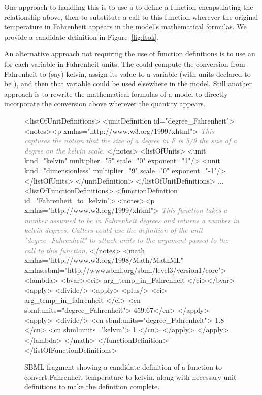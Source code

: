 \begin{itemize}
  One approach to handling this is to use a \FunctionDefinition to
  define a function encapsulating the relationship above, then to
  substitute a call to this function wherever the original
  temperature in Fahrenheit appears in the model's mathematical
  formulas.  We provide a candidate definition in
  Figure~\vref{fig:ftok}. 

  An alternative approach not requiring the use of function
  definitions is to use an \AssignmentRule for each variable in
  Fahrenheit units.  The \AssignmentRule could compute the
  conversion from Fahrenheit to (say) kelvin, assign its value to
  a variable (with units declared to be ), and then
  that variable could be used elsewhere in the model.  Still
  another approach is to rewrite the mathematical formulas of a
  model to directly incorporate the conversion above wherever the
  quantity appears.

\end{itemize}

\begin{figure}
  \begin{example}
<listOfUnitDefinitions>
    <unitDefinition id="degree_Fahrenheit">
        <notes><p xmlns="http://www.w3.org/1999/xhtml">
            \textcolor{gray}{\emph{This captures the notion that the size of a degree in F
            is 5/9 the size of a degree on the kelvin scale.}}
        </notes>
        <listOfUnits>
            <unit kind="kelvin"        multiplier="5" scale="0" exponent="1"/>
            <unit kind="dimensionless" multiplier="9" scale="0" exponent="-1"/>
        </listOfUnits>
    </unitDefinition>
</listOfUnitDefinitions>
...
<listOfFunctionDefinitions>
    <functionDefinition id="Fahrenheit_to_kelvin">
        <notes><p xmlns="http://www.w3.org/1999/xhtml">
            \textcolor{gray}{\emph{This function takes a number assumed to be in Fahrenheit 
            degrees and returns a number in kelvin degrees.  Callers could use
            the definition of the unit "degree_Fahrenheit" to attach units to
            the argument passed to the call to this function.}} 
        </notes>
        <math xmlns="http://www.w3.org/1998/Math/MathML"
              xmlns:sbml="http://www.sbml.org/sbml/level3/version1/core">
            <lambda>
                <bvar><ci> arg_temp_in_Fahrenheit </ci></bvar>
                <apply>
                    <divide/>
                    <apply>
                        <plus/>
                        <ci> arg_temp_in_fahrenheit </ci>
                        <cn sbml:units="degree_Fahrenheit"> 459.67</cn>
                    </apply>
                    <apply>
                        <divide/>
                        <cn sbml:units="degree_Fahrenheit"> 1.8 </cn>
                        <cn sbml:units="kelvin"> 1 </cn>
                    </apply>
                </apply>
            </lambda>
        </math>
    </functionDefinition>
</listOfFunctionDefinitions>
\end{example}
\caption{SBML fragment showing a candidate definition of a
  function to convert Fahrenheit temperature to kelvin, along with
  necessary unit definitions to make the definition complete.}
    \label{fig:ftok}
\end{figure}

